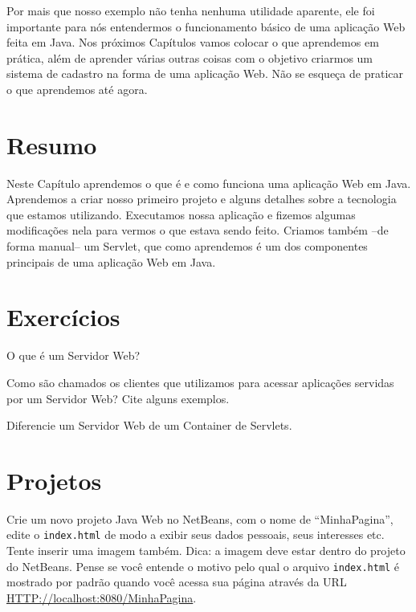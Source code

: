 Por mais que nosso exemplo não tenha nenhuma utilidade aparente, ele foi importante para nós entendermos o funcionamento básico de uma aplicação Web feita em Java. Nos próximos Capítulos vamos colocar o que aprendemos em prática, além de aprender várias outras coisas com o objetivo criarmos um sistema de cadastro na forma de uma aplicação Web. Não se esqueça de praticar o que aprendemos até agora. 


\section{Resumo}

Neste Capítulo aprendemos o que é e como funciona uma aplicação Web em Java. Aprendemos a criar nosso primeiro projeto e alguns detalhes sobre a tecnologia que estamos utilizando. Executamos nossa aplicação e fizemos algumas modificações nela para vermos o que estava sendo feito. Criamos também –de forma manual– um Servlet, que como aprendemos é um dos componentes principais de uma aplicação Web em Java.


\section{Exercícios}

\begin{exercicioSemArquivo}{}{}{}
    O que é um Servidor Web?
\end{exercicioSemArquivo}

\begin{exercicioSemArquivo}{}{}{}
    Como são chamados os clientes que utilizamos para acessar aplicações servidas por um Servidor Web? Cite alguns exemplos.
\end{exercicioSemArquivo}

\begin{exercicioSemArquivo}{}{}{}
    Diferencie um Servidor Web de um Container de Servlets.
\end{exercicioSemArquivo}


\section{Projetos}

\begin{projetoSemArquivo}{}{}{}
    Crie um novo projeto Java Web no NetBeans, com o nome de ``MinhaPagina'', edite o \texttt{index.html} de modo a exibir seus dados pessoais, seus interesses etc. Tente inserir uma imagem também. Dica: a imagem deve estar dentro do projeto do NetBeans. Pense se você entende o motivo pelo qual o arquivo \texttt{index.html} é mostrado por padrão quando você acessa sua página através da URL \url{HTTP://localhost:8080/MinhaPagina}.
\end{projetoSemArquivo}

